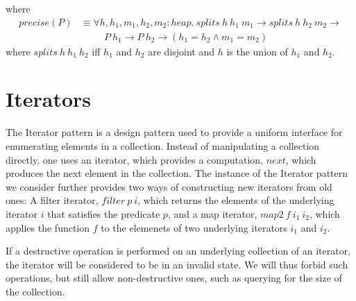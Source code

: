 \documentclass[a4paper,english]{article}
\newcommand{\HEAP}[0]{heap}
\begin{document}
where
\begin{align*}
precise(P) &\equiv \forall h, h_1, m_1, h_2, m_2 : \HEAP.\ splits\ h\ h_1\ m_1 \rightarrow splits\ h\ h_2\ m_2 \rightarrow\\
&\quad\quad\ \ P\ h_1 \rightarrow P\ h_2 \rightarrow (h_1 = h_2 \land m_1 = m_2)
\end{align*}
where $splits\ h\ h_1\ h_2$ iff $h_1$ and $h_2$ are disjoint and $h$ is the
union of $h_1$ and $h_2$.

\section{Iterators}

The Iterator pattern is a design pattern used to provide a uniform interface
for enumerating elements in a collection. Instead of manipulating a collection
directly, one uses an iterator, which provides a computation, $next$, which
produces the next element in the collection. The instance of the Iterator
pattern we consider further provides two ways of constructing new iterators
from old ones: A filter iterator, $filter\ p\ i$, which returns the elements of
the underlying iterator $i$ that satisfies the predicate $p$, and a map
iterator, $map2\ f\ i_1\ i_2$, which applies the function $f$ to the elemenets
of two underlying iterators $i_1$ and $i_2$. 

If a destructive operation is performed on an underlying collection of an
iterator, the iterator will be considered to be in an invalid state. We will
thus forbid such operations, but still allow non-destructive ones, such as
querying for the size of the collection.
\end{document}
